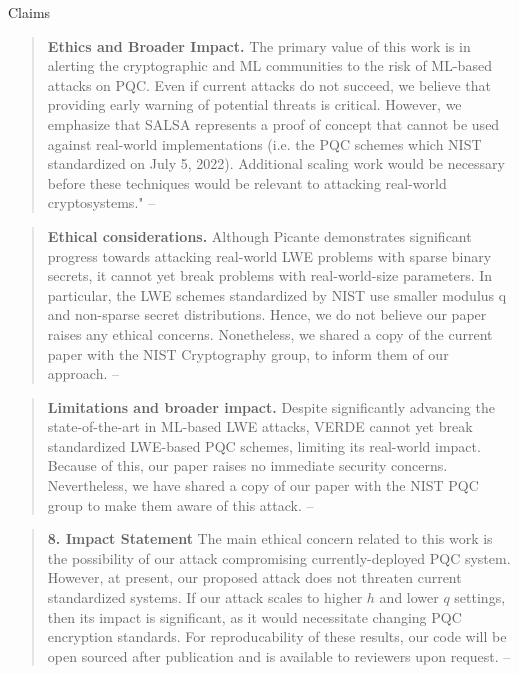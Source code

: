 \documentclass[table,10pt,aspectratio=169]{beamer}
\begin{document}
\begin{frame}[allowframebreaks]{Claims}
\begin{quote}
\textbf{Ethics and Broader Impact.} The primary value of this work is in alerting the cryptographic and ML communities to the risk of ML-based attacks on PQC. Even if current attacks do not succeed, we believe that \alert{providing early warning of potential threats is critical}. However, we emphasize that SALSA represents a proof of concept that cannot be used against real-world implementations (i.e. the PQC schemes which NIST standardized on July 5, 2022). Additional scaling work would be necessary before these techniques would be relevant to attacking real-world cryptosystems." -- \cite{NeurIPS:WCCL22}
\end{quote}

\framebreak

\begin{quote}
\textbf{Ethical considerations.} Although Picante demonstrates significant progress towards attacking real-world LWE problems with sparse binary secrets, \alert{it cannot yet break} problems with real-world-size parameters. In particular, the LWE schemes standardized by NIST use smaller modulus q and non-sparse secret distributions. Hence, we do not believe our paper raises any ethical concerns. Nonetheless, we shared a copy of the current paper with the NIST Cryptography group, to inform them of our approach. --  \cite{CCS:LSWMGCL23}
\end{quote}

\framebreak

\begin{quote}
\textbf{Limitations and broader impact.} Despite significantly advancing the state-of-the-art in ML-based
LWE attacks, VERDE \alert{cannot yet break} standardized LWE-based PQC schemes, limiting its real-world
impact. Because of this, our paper raises no immediate security concerns. Nevertheless, we have
shared a copy of our paper with the NIST PQC group to make them aware of this attack. -- \cite{EPRINT:LSWACL23}
\end{quote}

\framebreak

\begin{quote}
\textbf{8. Impact Statement} The main ethical concern related to this work is the possibility of our attack compromising currently-deployed PQC system. However, \alert{at present, our proposed attack does not threaten current standardized systems}. If our attack scales to higher \(h\) and lower \(q\) settings, then its impact is significant, as it would necessitate changing PQC encryption standards. For reproducability of these results, our code will be open sourced after publication and is available to reviewers upon request. -- \cite{EPRINT:SWLNSCL24} 
\end{quote}
\end{frame}
\end{document}
